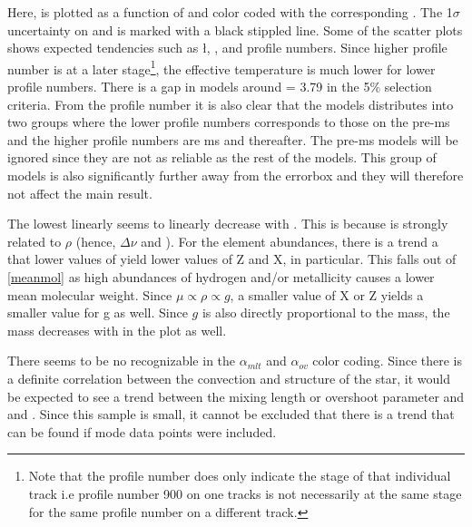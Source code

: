 Here, \logg is plotted as a function of \teff and color coded with the corresponding \chis. The 1$\sigma$ uncertainty on \logg and \teff is marked with a black stippled line. Some of the scatter plots shows expected tendencies such as \l, \logg, \teff and profile numbers. Since higher profile number is at a later stage\footnote{Note that the profile number does only indicate the stage of that individual track i.e profile number 900 on one tracks is not necessarily at the same stage for the same profile number on a different track. }, the effective temperature is much lower for lower profile numbers. There is a gap in models around \teff = 3.79 in the 5\% selection criteria. From the profile number it is also clear that the models distributes into two groups where the lower profile numbers corresponds to those on the pre-ms and the higher profile numbers are ms and thereafter. The pre-ms models will be ignored since they are not as reliable as the rest of the models. This group of models is also significantly further away from the errorbox and they will therefore not affect the main result. 

The lowest \chis linearly seems to linearly decrease with \teff. This is because \logg is strongly related to $\rho$ (hence, $\Delta \nu$ and \teff).  
For the element abundances, there is a trend a that lower values of \logg yield lower values of Z and X, in particular. This falls out of \eqref{meanmol} as high abundances of hydrogen and/or metallicity causes a lower mean molecular weight. Since $\mu \propto \rho \propto g$, a smaller value of X or Z yields a smaller value for g as well. Since $g$ is also directly proportional to the mass, the mass decreases with \logg in the plot as well. 

There seems to be no recognizable  in the $\alpha_{mlt}$ and $\alpha_{ov}$ color coding. Since there is a definite correlation between the convection and structure of the star, it would be expected to see a trend between the mixing length or overshoot parameter and \logg and \teff. Since this sample is small, it cannot be excluded that there is a trend that can be found if mode data points were included.   


